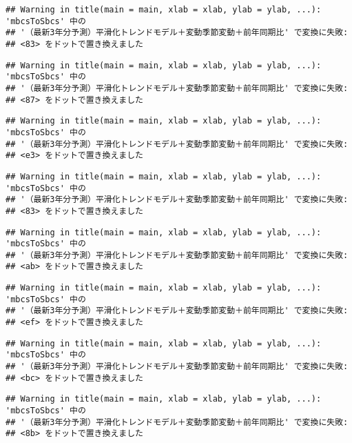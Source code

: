 \documentclass[]{article}
\begin{document}
\begin{verbatim}
## Warning in title(main = main, xlab = xlab, ylab = ylab, ...): 'mbcsToSbcs' 中の
## '（最新3年分予測）平滑化トレンドモデル＋変動季節変動＋前年同期比' で変換に失敗:
## <83> をドットで置き換えました
\end{verbatim}

\begin{verbatim}
## Warning in title(main = main, xlab = xlab, ylab = ylab, ...): 'mbcsToSbcs' 中の
## '（最新3年分予測）平滑化トレンドモデル＋変動季節変動＋前年同期比' で変換に失敗:
## <87> をドットで置き換えました
\end{verbatim}

\begin{verbatim}
## Warning in title(main = main, xlab = xlab, ylab = ylab, ...): 'mbcsToSbcs' 中の
## '（最新3年分予測）平滑化トレンドモデル＋変動季節変動＋前年同期比' で変換に失敗:
## <e3> をドットで置き換えました
\end{verbatim}

\begin{verbatim}
## Warning in title(main = main, xlab = xlab, ylab = ylab, ...): 'mbcsToSbcs' 中の
## '（最新3年分予測）平滑化トレンドモデル＋変動季節変動＋前年同期比' で変換に失敗:
## <83> をドットで置き換えました
\end{verbatim}

\begin{verbatim}
## Warning in title(main = main, xlab = xlab, ylab = ylab, ...): 'mbcsToSbcs' 中の
## '（最新3年分予測）平滑化トレンドモデル＋変動季節変動＋前年同期比' で変換に失敗:
## <ab> をドットで置き換えました
\end{verbatim}

\begin{verbatim}
## Warning in title(main = main, xlab = xlab, ylab = ylab, ...): 'mbcsToSbcs' 中の
## '（最新3年分予測）平滑化トレンドモデル＋変動季節変動＋前年同期比' で変換に失敗:
## <ef> をドットで置き換えました
\end{verbatim}

\begin{verbatim}
## Warning in title(main = main, xlab = xlab, ylab = ylab, ...): 'mbcsToSbcs' 中の
## '（最新3年分予測）平滑化トレンドモデル＋変動季節変動＋前年同期比' で変換に失敗:
## <bc> をドットで置き換えました
\end{verbatim}

\begin{verbatim}
## Warning in title(main = main, xlab = xlab, ylab = ylab, ...): 'mbcsToSbcs' 中の
## '（最新3年分予測）平滑化トレンドモデル＋変動季節変動＋前年同期比' で変換に失敗:
## <8b> をドットで置き換えました
\end{verbatim}
\end{document}
